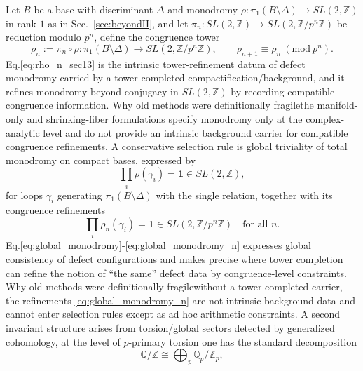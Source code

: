 \documentclass[11pt]{article}
\theoremstyle{remark}
\newcommand{\Z}{\mathbb{Z}}
\newcommand{\Q}{\mathbb{Q}}
\begin{document}
Let \(B\) be a base with discriminant \(\Delta\) and monodromy \(\rho:\pi_{1}(B\setminus\Delta)\to SL(2,\Z)\) in rank \(1\) as in Sec.~\ref{sec:beyondII}, and let \(\pi_{n}:SL(2,\Z)\to SL(2,\Z/p^{n}\Z)\) be reduction modulo \(p^{n}\), define the congruence tower
\begin{equation}\label{eq:rho_n_sec13}
\rho_{n}:=\pi_{n}\circ\rho:\pi_{1}(B\setminus\Delta)\to SL(2,\Z/p^{n}\Z),
\qquad
\rho_{n+1}\equiv \rho_{n}\ (\mathrm{mod}\ p^{n}).
\end{equation}
Eq.\eqref{eq:rho_n_sec13} is the intrinsic tower-refinement datum of defect monodromy carried by a tower-completed compactification/background, and it refines monodromy beyond conjugacy in \(SL(2,\Z)\) by recording compatible congruence information. Why old methods were definitionally fragile\:the manifold-only and shrinking-fiber formulations specify monodromy only at the complex-analytic level and do not provide an intrinsic background carrier for compatible congruence refinements. A conservative selection rule is global triviality of total monodromy on compact bases, expressed by
\begin{equation}\label{eq:global_monodromy}
\prod_{i}\rho(\gamma_{i})=\mathbf{1}\in SL(2,\Z),
\end{equation}
for loops \(\gamma_i\) generating \(\pi_{1}(B\setminus\Delta)\) with the single relation, together with its congruence refinements
\begin{equation}\label{eq:global_monodromy_n}
\prod_{i}\rho_{n}(\gamma_{i})=\mathbf{1}\in SL(2,\Z/p^{n}\Z)\quad \text{for all }n.
\end{equation}
Eq.\eqref{eq:global_monodromy}-\eqref{eq:global_monodromy_n} expresses global consistency of defect configurations and makes precise where tower completion can refine the notion of ``the same'' defect data by congruence-level constraints. Why old methods were definitionally fragile\:without a tower-completed carrier, the refinements \eqref{eq:global_monodromy_n} are not intrinsic background data and cannot enter selection rules except as ad hoc arithmetic constraints. A second invariant structure arises from torsion/global sectors detected by generalized cohomology, at the level of \(p\)-primary torsion one has the standard decomposition
\begin{equation}\label{eq:QZ_decomp}
\Q/\Z\cong \bigoplus_{p}\Q_{p}/\Z_{p},
\end{equation}
\end{document}
